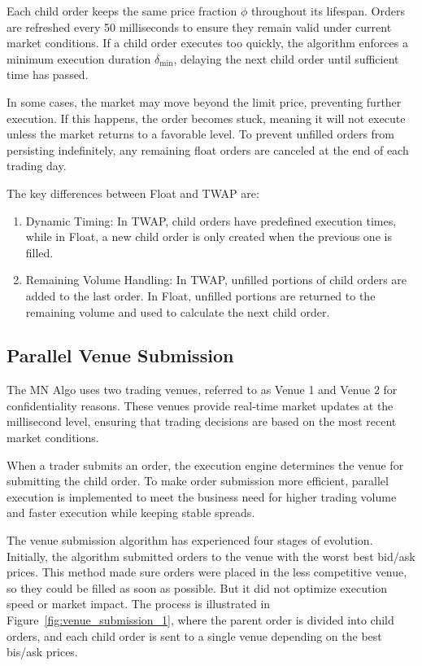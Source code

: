 Each child order keeps the same price fraction $\phi$ throughout its lifespan. Orders are refreshed every 50 milliseconds to ensure they remain valid under current market conditions. If a child order executes too quickly, the algorithm enforces a minimum execution duration $\delta_{\text{min}}$, delaying the next child order until sufficient time has passed.

In some cases, the market may move beyond the limit price, preventing further execution. If this happens, the order becomes stuck, meaning it will not execute unless the market returns to a favorable level. To prevent unfilled orders from persisting indefinitely, any remaining float orders are canceled at the end of each trading day.

The key differences between Float and TWAP are:
\begin{enumerate}
    \item Dynamic Timing: In TWAP, child orders have predefined execution times, while in Float, a new child order is only created when the previous one is filled.
    \item Remaining Volume Handling: In TWAP, unfilled portions of child orders are added to the last order. In Float, unfilled portions are returned to the remaining volume and used to calculate the next child order.
\end{enumerate}

\subsection{Parallel Venue Submission}
The MN Algo uses two trading venues, referred to as Venue 1 and Venue 2 for confidentiality reasons. These venues provide real-time market updates at the millisecond level, ensuring that trading decisions are based on the most recent market conditions. 

When a trader submits an order, the execution engine determines the venue for submitting the child order. To make order submission more efficient, parallel execution is implemented to meet the business need for higher trading volume and faster execution while keeping stable spreads.

The venue submission algorithm has experienced four stages of evolution. Initially, the algorithm submitted orders to the venue with the worst best bid/ask prices. This method made sure orders were placed in the less competitive venue, so they could be filled as soon as possible. But it did not optimize execution speed or market impact. The process is illustrated in Figure~\ref{fig:venue_submission_1}, where the parent order is divided into child orders, and each child order is sent to a single venue depending on the best bis/ask prices.

